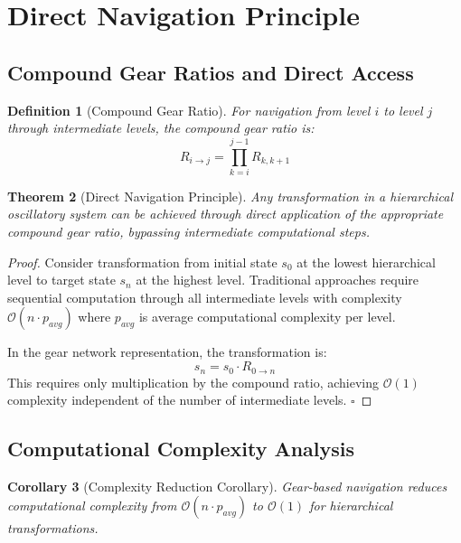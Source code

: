 \documentclass[11pt]{article}
\newtheorem{theorem}{Theorem}[section]
\newtheorem{corollary}[theorem]{Corollary}
\newtheorem{definition}[theorem]{Definition}
\theoremstyle{remark}
\begin{document}
\section{Direct Navigation Principle}

\subsection{Compound Gear Ratios and Direct Access}

\begin{definition}[Compound Gear Ratio]
For navigation from level $i$ to level $j$ through intermediate levels, the compound gear ratio is:
\begin{equation}
R_{i \to j} = \prod_{k=i}^{j-1} R_{k,k+1}
\label{eq:compound_gear_ratio}
\end{equation}
\end{definition}

\begin{theorem}[Direct Navigation Principle]
Any transformation in a hierarchical oscillatory system can be achieved through direct application of the appropriate compound gear ratio, bypassing intermediate computational steps.
\end{theorem}

\begin{proof}
Consider transformation from initial state $s_0$ at the lowest hierarchical level to target state $s_n$ at the highest level. Traditional approaches require sequential computation through all intermediate levels with complexity $\mathcal{O}(n \cdot p_{avg})$ where $p_{avg}$ is average computational complexity per level.

In the gear network representation, the transformation is:
$$s_n = s_0 \cdot R_{0 \to n}$$
This requires only multiplication by the compound ratio, achieving $\mathcal{O}(1)$ complexity independent of the number of intermediate levels. $\square$
\end{proof}

\subsection{Computational Complexity Analysis}

\begin{corollary}[Complexity Reduction Corollary]
Gear-based navigation reduces computational complexity from $\mathcal{O}(n \cdot p_{avg})$ to $\mathcal{O}(1)$ for hierarchical transformations.
\end{corollary}
\end{document}
